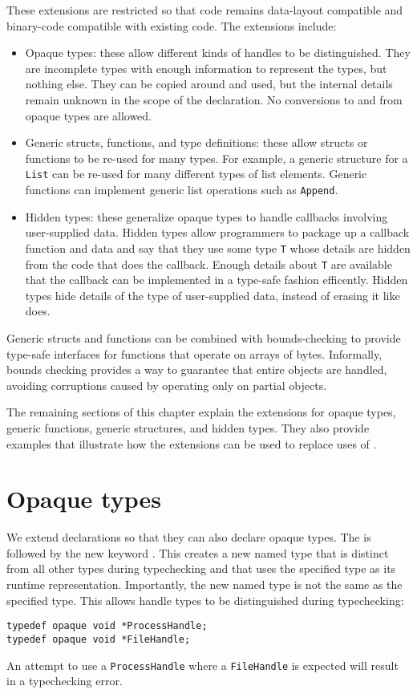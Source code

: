 These extensions are restricted so that code remains data-layout compatible and binary-code
compatible with existing code.  The extensions include:
\begin{itemize}
\item Opaque types: these allow different kinds of handles to be distinguished.
They are incomplete types with enough information to represent
the types, but nothing else.  They can be copied around and used, but the internal
details remain unknown in the scope of the declaration.  No conversions to and 
from opaque types are allowed.

\item Generic structs, functions, and type definitions: these allow structs
or functions to be re-used for many types.   For example,
a generic structure for a  \lstinline+List+ can be re-used for many different types of list
elements.  Generic functions can implement generic list operations such as \lstinline+Append+.

\item Hidden types: these generalize opaque types to handle callbacks involving
user-supplied data.  Hidden types allow programmers to package up a callback function and data and
say that they use  some type \lstinline+T+ whose details are hidden from the code that does
the callback.   Enough details about \lstinline+T+ are available that the callback can be 
implemented in a type-safe fashion efficently.  Hidden types hide details of the type 
of user-supplied data, instead of erasing it like \uncheckedptrvoid{} does.
\end{itemize}

Generic structs and functions can be combined with bounds-checking 
to provide type-safe interfaces for functions that operate on arrays of bytes.
Informally, bounds checking provides a way to guarantee that entire objects are handled,
avoiding corruptions caused by operating only on partial objects.

The remaining sections of this chapter explain the extensions for 
opaque types, generic functions, generic structures, and hidden types.  They also
provide examples that illustrate how the extensions can be used to
replace uses of \uncheckedptrvoid{}.

\section{Opaque types}

We extend  declarations so that they can also declare opaque types. 
The  is followed by the new keyword .
This creates a new named type that is distinct from all other types during
typechecking and that uses the specified type as its runtime representation.
Importantly, the new named type is not the same as the specified type.  This allows
handle types to be distinguished during typechecking:
\begin{lstlisting}
typedef opaque void *ProcessHandle;
typedef opaque void *FileHandle;
\end{lstlisting}
An attempt to use a \lstinline+ProcessHandle+ where a \lstinline+FileHandle+ 
is expected will result in a typechecking error.

